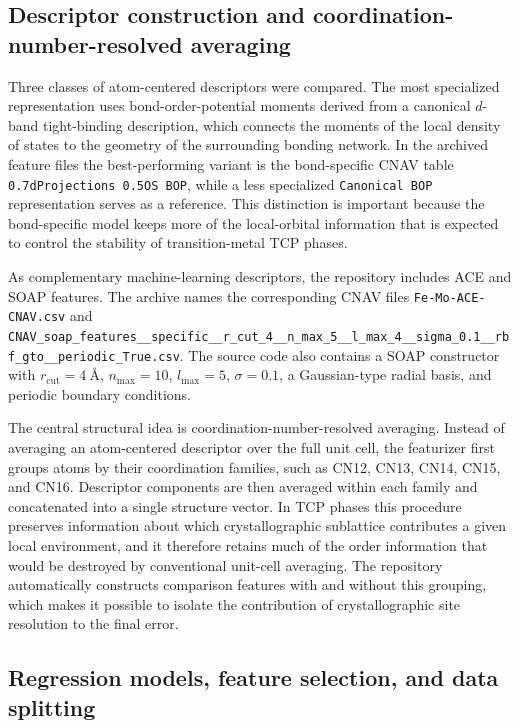 \subsection{Descriptor construction and coordination-number-resolved averaging}

Three classes of atom-centered descriptors were compared. The most specialized representation uses bond-order-potential moments derived from a canonical $d$-band tight-binding description, which connects the moments of the local density of states to the geometry of the surrounding bonding network. In the archived feature files the best-performing variant is the bond-specific CNAV table \texttt{0.7dProjections 0.5OS BOP}, while a less specialized \texttt{Canonical BOP} representation serves as a reference. This distinction is important because the bond-specific model keeps more of the local-orbital information that is expected to control the stability of transition-metal TCP phases.\cite{PettiforAoki1996,Pettifor2004}

As complementary machine-learning descriptors, the repository includes ACE and SOAP features. The archive names the corresponding CNAV files \texttt{Fe-Mo-ACE-CNAV.csv} and \texttt{CNAV\_soap\_features\_\_specific\_\_r\_cut\_4\_\_n\_max\_5\_\_l\_max\_4\_\_sigma\_0.1\_\_rbf\_gto\_\_periodic\_True.csv}. The source code also contains a SOAP constructor with $r_{\mathrm{cut}}=\SI{4}{\angstrom}$, $n_{\max}=10$, $l_{\max}=5$, $\sigma=0.1$, a Gaussian-type radial basis, and periodic boundary conditions.\cite{Drautz2019,Bartok2013,Himanen2020,Lysogorskiy2021}

The central structural idea is coordination-number-resolved averaging. Instead of averaging an atom-centered descriptor over the full unit cell, the featurizer first groups atoms by their coordination families, such as CN12, CN13, CN14, CN15, and CN16. Descriptor components are then averaged within each family and concatenated into a single structure vector. In TCP phases this procedure preserves information about which crystallographic sublattice contributes a given local environment, and it therefore retains much of the order information that would be destroyed by conventional unit-cell averaging. The repository automatically constructs comparison features with and without this grouping, which makes it possible to isolate the contribution of crystallographic site resolution to the final error.

\subsection{Regression models, feature selection, and data splitting}

